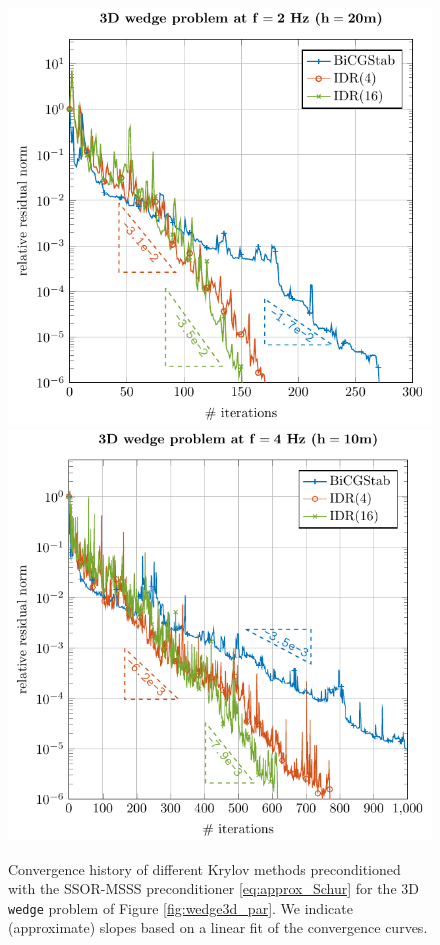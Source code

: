  \begin{figure}[t]
 \centering
  \includegraphics[width=0.8\columnwidth]{wedge3d_f2_new3.pdf} \\
  \includegraphics[width=0.8\columnwidth]{wedge3d_f4_new2.pdf}
  \caption{Convergence history of different Krylov methods preconditioned with the SSOR-MSSS preconditioner \eqref{eq:approx_Schur} for the 3D \texttt{wedge} problem of Figure \ref{fig:wedge3d_par}. We indicate (approximate) slopes based on a linear fit of the convergence curves.}\label{fig:3dwegdep1_conv}
 \end{figure}
 
